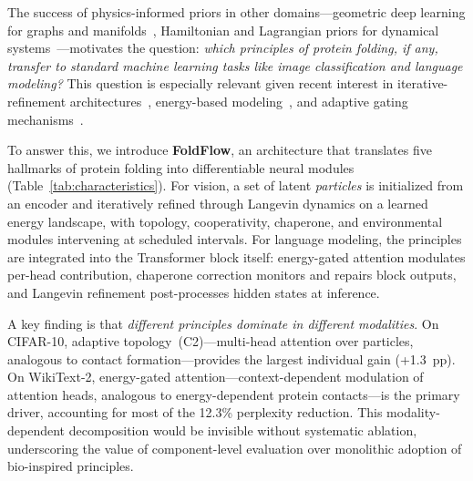 \documentclass[10pt]{article}
\begin{document}
The success of physics-informed priors in other domains---geometric deep
learning for graphs and manifolds~\citep{bronstein2021geometric},
Hamiltonian and Lagrangian priors for dynamical
systems~\citep{chen2018neural}---motivates the question:
\emph{which principles of protein folding, if any, transfer to
standard machine learning tasks like image classification and language
modeling?}  This question is especially relevant given recent interest
in iterative-refinement architectures~\citep{dehghani2019universal,
bai2019deep}, energy-based modeling~\citep{lecun2006tutorial,
du2019implicit}, and adaptive gating
mechanisms~\citep{shazeer2017outrageously, fedus2022switch}.

To answer this, we introduce \textbf{FoldFlow}, an architecture that
translates five hallmarks of protein folding into differentiable neural
modules (Table~\ref{tab:characteristics}).  For vision, a set of latent
\emph{particles} is initialized from an encoder and iteratively refined
through Langevin dynamics on a learned energy landscape, with topology,
cooperativity, chaperone, and environmental modules intervening at
scheduled intervals.  For language modeling, the principles are
integrated into the Transformer block itself: energy-gated attention
modulates per-head contribution, chaperone correction monitors and
repairs block outputs, and Langevin refinement post-processes hidden
states at inference.

A key finding is that \emph{different principles dominate in different
modalities}.  On CIFAR-10, adaptive topology~(C2)---multi-head attention
over particles, analogous to contact formation---provides the largest
individual gain (+1.3~pp).  On WikiText-2, energy-gated
attention---context-dependent modulation of attention heads, analogous
to energy-dependent protein contacts---is the primary driver, accounting
for most of the 12.3\% perplexity reduction.  This modality-dependent
decomposition would be invisible without systematic ablation, underscoring
the value of component-level evaluation over monolithic adoption of
bio-inspired principles.
\end{document}
